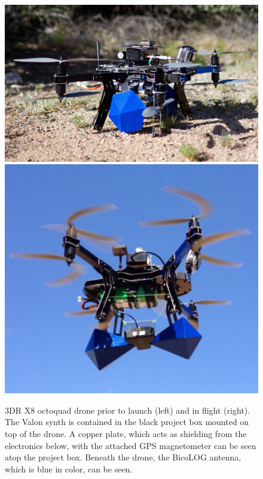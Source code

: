 \documentclass[preprint2,numberedappendix,tighten,twocolappendix]{aastex6}
\begin{document}
\begin{figure}[h]
\centering
\includegraphics[scale=0.18]{images/drone2.png}
\includegraphics[scale=0.339]{images/drone.png}
\caption{3DR X8 octoquad drone prior to launch (left) and in flight (right).  The Valon synth is contained in the black project box mounted on top of the drone.  A copper plate, which acts as shielding from the electronics below, with the attached GPS magnetometer can be seen atop the project box. Beneath the drone, the BicoLOG antenna, which is blue in color, can be seen.}
\label{fig:drone}
\end{figure}
\end{document}
